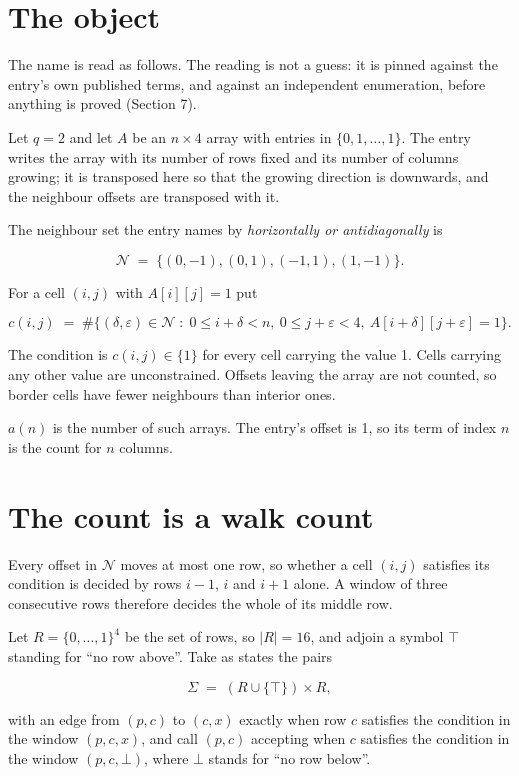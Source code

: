 \documentclass[11pt]{article}
\theoremstyle{definition}
\begin{document}
\section{The object}

The name is read as follows. The reading is not a guess: it is pinned against the entry's own published terms, and against an independent enumeration, before anything is proved (Section 7).

Let $q = 2$ and let $A$ be an $n \times 4$ array with entries in $\{0,1,\dots,1\}$. The entry writes the array with its number of rows fixed and its number of columns growing; it is transposed here so that the growing direction is downwards, and the neighbour offsets are transposed with it.

The neighbour set the entry names by {\itshape horizontally or antidiagonally} is

\[\mathcal{N} \;=\; \{(0,-1), (0,1), (-1,1), (1,-1)\}.\]

For a cell $(i,j)$ with $A[i][j] = 1$ put

\[c(i,j) \;=\; \#\bigl\{(\delta,\varepsilon)\in\mathcal{N} \;:\; 0\le i+\delta<n,\ 0\le j+\varepsilon<4,\ A[i+\delta][j+\varepsilon] = 1\bigr\}.\]

The condition is $c(i,j) \in \{1\}$ for every cell carrying the value 1. Cells carrying any other value are unconstrained. Offsets leaving the array are not counted, so border cells have fewer neighbours than interior ones.

$a(n)$ is the number of such arrays. The entry's offset is 1, so its term of index $n$ is the count for $n$ columns.

\section{The count is a walk count}

Every offset in $\mathcal{N}$ moves at most one row, so whether a cell $(i,j)$ satisfies its condition is decided by rows $i-1$, $i$ and $i+1$ alone. A window of three consecutive rows therefore decides the whole of its middle row.

Let $R = \{0,\dots,1\}^{4}$ be the set of rows, so $|R| = 16$, and adjoin a symbol $\top$ standing for ``no row above''. Take as states the pairs

\[\Sigma \;=\; (R \cup \{\top\}) \times R,\]

with an edge from $(p,c)$ to $(c,x)$ exactly when row $c$ satisfies the condition in the window $(p,c,x)$, and call $(p,c)$ accepting when $c$ satisfies the condition in the window $(p,c,\bot)$, where $\bot$ stands for ``no row below''.
\end{document}
